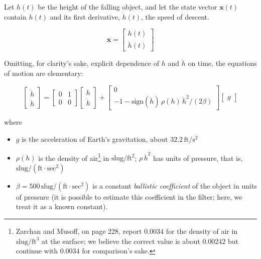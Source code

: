 \documentclass[10pt,oneside,x11names]{article}
\begin{document}
Let \(h(t)\) be the height of
the falling object, and let the state vector \(\mathbold{x}(t)\) contain \(h(t)\)
and its first derivative, \(\dot{h}(t)\), the speed of descent.

\begin{equation*}
\mathbold{x} = 
\begin{bmatrix} { h } (t) \\ \dot { h } (t) \end{bmatrix}
\end{equation*}

Omitting, for clarity's sake, explicit dependence of \(h\) and \(\dot{h}\) on time,
the equations of motion are elementary:

\begin{equation}
\label{eqn:equations-of-motion}
\begin{bmatrix} \dot { h } \\ \ddot { h }  \end{bmatrix}
=
\begin{bmatrix}
0 & 1 \\
0 & 0
\end{bmatrix}
\begin{bmatrix} h \\ \dot { h }  \end{bmatrix}
+
\begin{bmatrix} 0 \\ -1 - \textrm{sign}({\dot{h}})\,\rho(h)\,{{\dot{h}}^2}/(2\beta)
\end{bmatrix}
\begin{bmatrix} g \end{bmatrix}
\end{equation}

\noindent where 
\begin{itemize}
\item \(g\) is the acceleration of Earth's gravitation, about
\(32.2\,\textrm{ft}/{\textrm{s}}^2\)
\item \(\rho(h)\) is the density of air\footnote{Zarchan and Musoff, on page 228, report \(0.0034\) for the density of air in
\(\textrm{slug}/\textrm{ft}^3\) at the surface; we believe the correct
value is about \(0.00242\) but continue with \(0.0034\) for comparison's sake.} in \(\textrm{slug}/{\textrm{ft}}^2\); \(\rho\,{{\dot{h}}^2}\) has
units of pressure, that is, \(\textrm{slug}/(\textrm{ft}\cdot{\textrm{sec}^2})\)
\item \(\beta = 500\,\textrm{slug}/(\textrm{ft}\cdot{\textrm{sec}^2})\)
is a constant \emph{ballistic coefficient}  of the object in units of pressure (it
is possible to estimate this coefficient in the filter; here, we
treat it as a known constant).
\end{itemize}
\end{document}
